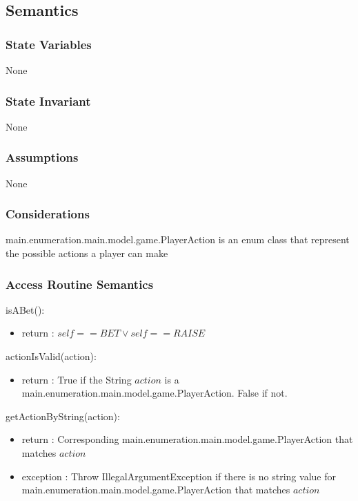 \documentclass[12pt, titlepage]{article}
\begin{document}
    \subsection* {Semantics}
    
    \subsubsection* {State Variables}
        None
        
    \subsubsection* {State Invariant}
        None
    
    \subsubsection* {Assumptions}
        None
    
    \subsubsection* {Considerations}
        main.enumeration.main.model.game.PlayerAction is an enum class that represent the possible actions a player can make
    
    \subsubsection* {Access Routine Semantics}
    
        \noindent isABet():
        \begin{itemize}
        \item return : $self == BET \vee self == RAISE$
        \end{itemize}
        
        \noindent actionIsValid(action):
        \begin{itemize}
        \item return : True if the String $action$ is a main.enumeration.main.model.game.PlayerAction. False if not.
        \end{itemize}
        
        \noindent getActionByString(action):
        \begin{itemize}
        \item return : Corresponding main.enumeration.main.model.game.PlayerAction that matches $action$
        \item exception : Throw IllegalArgumentException if there is no  string value for main.enumeration.main.model.game.PlayerAction that matches $action$
        \end{itemize}
         
\end{document}
